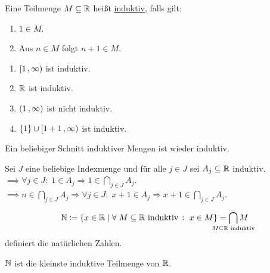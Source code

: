 \documentclass[../ana1.tex]{subfiles}
\begin{document}
\iftoggle{short}{}{\newpage}%

\begin{defi}
	Eine Teilmenge \(M \subseteq \mathbb{R} \) heißt \underline{induktiv}, falls gilt:
	\begin{enumerate}[label= (I\arabic*)]
		\item\label{ax:I1} \(1 \in M \).
		\item\label{ax:I2} Aus \(n \in M \) folgt \(n + 1 \in M \).
	\end{enumerate}
\end{defi}

\begin{bspe}\leavevmode
	\begin{enumerate}[(1)]
		\item \([1 \operatorname{,} \infty) \) ist induktiv.
		\item \(\mathbb{R} \) ist induktiv.
		\item \((1 \operatorname{,} \infty) \) ist nicht induktiv.
		\item \(\{1\} \cup [1+1 \operatorname{,} \infty) \) ist induktiv.
	\end{enumerate}
\end{bspe}

\begin{bem}
	Ein beliebiger Schnitt induktiver Mengen ist wieder induktiv.
\end{bem}
\begin{bew}
	Sei \(J \) eine beliebige Indexmenge und für alle \(j \in J \) sei \(A_{j} \subseteq \mathbb{R} \) induktiv. \\
	\(\implies \forall j \in J \colon  \; 1 \in A_{j} \Rightarrow 1 \in \underset{j \in J}{\bigcap}A_{j} \). \\
	\(\implies n \in \underset{j \in J}{\bigcap}A_{j} \Rightarrow \forall j \in J \colon  \; x + 1 \in A_{j} \Rightarrow x + 1 \in \underset{j \in J}{\bigcap}A_{j} \).
\end{bew}

\begin{defi}
	\[\N \coloneqq \set{x \in \R  \; \vert  \; \forall  \; M \subseteq \R \text{ induktiv } \colon  \; x \in M} = \smashoperator{\bigcap_{M \subseteq \R \text{ induktiv}}} M \]
	definiert die natürlichen Zahlen.
\end{defi}

\begin{bem}
	\(\mathbb{N} \) ist die kleinste induktive Teilmenge von \(\mathbb{R} \).
\end{bem}
\end{document}
